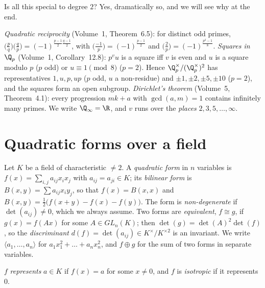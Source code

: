 Is all this special to degree $2$? Yes, dramatically so, and we will see why at the end.

\begin{reminder}
\emph{Quadratic reciprocity} (Volume~1, Theorem~6.5): for distinct odd primes, $\bigl(\frac pq\bigr)\bigl(\frac qp\bigr)=
(-1)^{\frac{p-1}2\frac{q-1}2}$, with $\bigl(\frac{-1}p\bigr)=(-1)^{\frac{p-1}2}$ and $\bigl(\frac2p\bigr)=(-1)^{\frac{p^2-1}8}$.
\emph{Squares in $\Q_p$} (Volume~1, Corollary~12.8): $p^vu$ is a square iff $v$ is even and $u$ is a square modulo $p$ ($p$ odd)
or $u\equiv1\pmod8$ ($p=2$). Hence $\Q_p^\times/(\Q_p^\times)^2$ has representatives $1,u,p,up$ ($p$ odd, $u$ a non-residue) and
$\pm1,\pm2,\pm5,\pm10$ ($p=2$), and the squares form an open subgroup. \emph{Dirichlet's theorem} (Volume~5, Theorem~4.1): every
progression $mk+a$ with $\gcd(a,m)=1$ contains infinitely many primes. We write $\Q_\infty=\R$, and $v$ runs over the
\emph{places} $2,3,5,\dots,\infty$.
\end{reminder}

\section{Quadratic forms over a field}

Let $K$ be a field of characteristic $\ne2$. A \emph{quadratic form} in $n$ variables is $f(x)=\sum_{i,j}a_{ij}x_ix_j$ with
$a_{ij}=a_{ji}\in K$; its \emph{bilinear form} is $B(x,y)=\sum a_{ij}x_iy_j$, so that $f(x)=B(x,x)$ and $B(x,y)=\frac12\bigl(f(x+y)
-f(x)-f(y)\bigr)$. The form is \emph{non-degenerate} if $\det(a_{ij})\ne0$, which we always assume. Two forms are
\emph{equivalent}, $f\cong g$, if $g(x)=f(Ax)$ for some $A\in GL_n(K)$; then $\det(g)=\det(A)^2\det(f)$, so the
\emph{discriminant} $d(f)=\det(a_{ij})\in K^\times/K^{\times2}$ is an invariant. We write $\langle a_1,\dots,a_n\rangle$ for
$a_1x_1^2+\dots+a_nx_n^2$, and $f\oplus g$ for the sum of two forms in separate variables.

$f$ \emph{represents} $a\in K$ if $f(x)=a$ for some $x\ne0$, and $f$ is \emph{isotropic} if it represents $0$.

